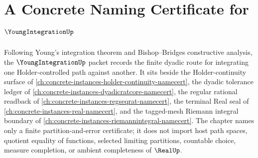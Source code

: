 \chapter{A Concrete Naming Certificate for $\YoungIntegrationUp$}
\label{ch:concrete-instances-young-integration-namecert}

Following Young's integration theorem and Bishop--Bridges constructive analysis, the $\YoungIntegrationUp$ packet records the finite dyadic route for integrating one Holder-controlled path against another. It sits beside the Holder-continuity surface of \autoref{ch:concrete-instances-holder-continuity-namecert}, the dyadic tolerance ledger of \autoref{ch:concrete-instances-dyadicratcore-namecert}, the regular rational readback of \autoref{ch:concrete-instances-regseqrat-namecert}, the terminal Real seal of \autoref{ch:concrete-instances-real-namecert}, and the tagged-mesh Riemann integral boundary of \autoref{ch:concrete-instances-riemannintegral-namecert}. The chapter names only a finite partition-and-error certificate; it does not import host path spaces, quotient equality of functions, selected limiting partitions, countable choice, measure completion, or ambient completeness of $\RealUp$.

